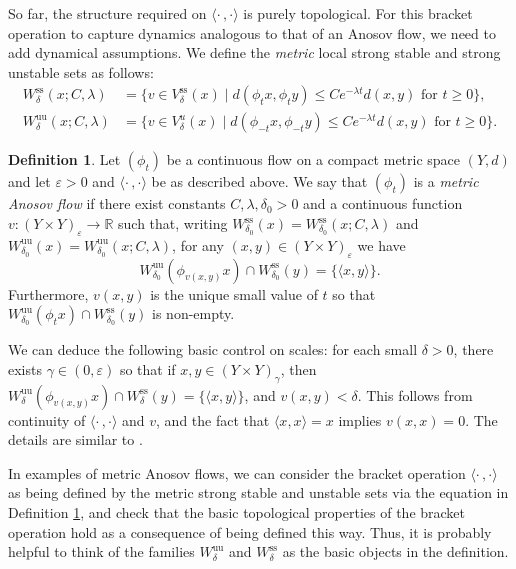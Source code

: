 \documentclass[JEP,XML,SOM,Unicode,NoFloatCountersInSection]{cedram}
\let\epsilon\varepsilon
\let\sep\mid
\newcommand{\lrangle}{\langle\cdot\,,\cdot\rangle}
\newcommand{\sts}{\mathrm{ss}}
\newcommand{\uu}{\mathrm{uu}}
\theoremstyle{definition}
\newtheorem{defn}[thm]{Definition}
\numberwithin{equation}{section}
\begin{document}
So far, the structure required on $\lrangle$ is purely topological. For this bracket operation to capture dynamics analogous to that of an Anosov flow, we need to add dynamical assumptions.
We define the \emph{metric} local strong stable and strong unstable sets as follows:
\begin{align*}
W^{\sts}_\delta (x; C, \lambda) &= \{ v \in V^{\sts}_\delta (x) \sep d(\phi_t x, \phi_t y) \leq Ce^{-\lambda t}d(x,y) \text{ for } t \geq 0\},\\
W^{\uu}_\delta (x; C, \lambda) &= \{ v \in V^{u}_\delta (x) \sep d(\phi_{-t} x, \phi_{-t} y) \leq Ce^{-\lambda t}d(x,y) \text{ for } t \geq 0\}.
\end{align*}

\begin{defn}\label{defn:metric anosov}
Let $(\phi_t)$ be a continuous flow on a compact metric space $(Y,d)$ and let $\epsilon>0$ and $\lrangle$ be as described above. We say that $(\phi_t)$ is a \emph{metric Anosov flow} if there exist constants $C, \lambda, \delta_0>0$ and a continuous function $v\colon(Y\times Y)_\epsilon \to \mathbb{R}$ such that, writing $W^{\sts}_{\delta_0} (x) = W^{\sts}_{\delta_0} (x; C, \lambda)$ and $W^{\uu}_{\delta_0} (x) = W^{\uu}_{\delta_0} (x; C, \lambda)$, for any $(x, y) \in (Y \times Y)_\epsilon$ we have
\[ W^{\uu}_{\delta_0}(\phi_{v(x,y)}x) \cap W^{\sts}_{\delta_0}(y) = \{\langle x,y\rangle \}. \]
Furthermore, $v(x,y)$ is the unique small value of $t$ so that $W^{\uu}_{\delta_0}(\phi_{t}x) \cap W^{\sts}_{\delta_0}(y)$ is non-empty.
\end{defn}

We can deduce the following basic control on scales: for each small $\delta>0$, there exists $\gamma\in(0, \epsilon)$ so that if $x,y \in (Y \times Y)_{\gamma}$, then $W^{\uu}_{\delta}(\phi_{v(x,y)}x) \cap W^{\sts}_{\delta}(y) = \{\langle x,y\rangle\}$, and $v(x,y)<\delta$. This follows from continuity of $\lrangle $ and $v$, and the fact that $\langle x,x\rangle =x$ implies $v(x,x)=0$. The details are similar to \cite[Lem.\,1.5]{bowen-periodic}.

In examples of metric Anosov flows, we can consider the bracket operation $\lrangle$ as being defined by the metric strong stable and unstable sets via the equation in Definition \ref{defn:metric anosov}, and check that the basic topological properties of the bracket operation hold as a consequence of being defined this way. Thus, it is probably helpful to think of the families $W^{\uu}_\delta$ and $W^{\sts}_\delta$ as the basic objects in the definition.
\end{document}
